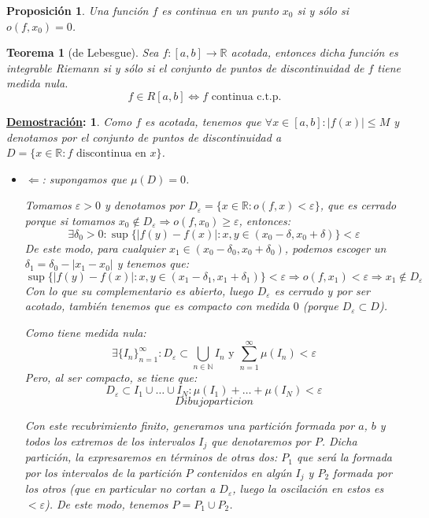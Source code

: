 \documentclass[10pt,a4paper,openright]{book}
\theoremstyle{break}
\newtheorem*{theo}{Teorema}
\newtheorem*{prop}{Proposición}
\newtheorem*{demo}{\underline{Demostración}:}
\begin{document}
\begin{prop}
Una función $f$ es continua en un punto $x_0$ si y sólo si $o\left(f, x_0\right) = 0$.
\end{prop}

\begin{theo}[de Lebesgue]
Sea $f: \left[a, b\right] \rightarrow \mathbb{R}$ acotada, entonces dicha función es integrable Riemann si y sólo si el conjunto de puntos de discontinuidad de $f$ tiene medida nula.
$$f\in R[a,b]\Leftrightarrow f \mbox{ continua c.t.p.}$$
\end{theo}
\begin{demo}
Como $f$ es acotada, tenemos que $\forall x \in \left[a, b\right] : \vert f\left(x\right)\vert \le M$ y denotamos por el conjunto de puntos de discontinuidad a $D = \{x\in \mathbb{R} : f \text{ discontinua en } x\}$.
\begin{itemize}
\item $\Leftarrow$: supongamos que $\mu\left(D\right) = 0$.

Tomamos $\varepsilon > 0$ y denotamos por $D_{\varepsilon} = \{x\in \mathbb{R}: o\left(f, x\right) < \varepsilon\}$, que es cerrado porque si tomamos $x_0 \not\in D_{\varepsilon} \Rightarrow o\left(f, x_0\right) \ge \varepsilon$, entonces:
$$\exists \delta_0 > 0: \sup \{ \vert f\left(y\right) - f\left(x\right) \vert: x, y \in \left(x_0 - \delta, x_0 + \delta \right) \} < \varepsilon$$
De este modo, para cualquier $x_1 \in \left(x_0 - \delta_0, x_0 + \delta_0 \right)$, podemos escoger un $\delta_1 = \delta_0 - |x_1-x_0|$ y tenemos que:
$$\sup \{ \vert f\left(y\right) - f\left(x\right) \vert : x, y \in \left(x_1 - \delta_1, x_1 + \delta_1 \right) \} < \varepsilon \Rightarrow o\left(f, x_1\right) < \varepsilon \Rightarrow x_1 \not\in D_{\varepsilon}$$
Con lo que su complementario es abierto, luego $D_\varepsilon$ es cerrado y por ser acotado, también tenemos que es compacto con medida $0$ (porque $D_\varepsilon \subset D$).

Como tiene medida nula:
$$\exists \{I_n\}_{n=1}^{\infty}: D_{\varepsilon} \subset \bigcup_{n \in \mathbb{N}} I_n \mbox{ y } \sum_{n=1}^{\infty} \mu\left(I_n\right) < \varepsilon$$
Pero, al ser compacto, se tiene que:
$$D_{\varepsilon} \subset I_1 \cup \ldots \cup I_N :  \mu\left(I_1\right) + \ldots + \mu\left(I_N\right) < \varepsilon $$
$$Dibujo particion$$

Con este recubrimiento finito, generamos una partición formada por $a$, $b$ y todos los extremos de los intervalos $I_j$ que denotaremos por $P$. Dicha partición, la expresaremos en términos de otras dos: $P_1$ que será la formada por los intervalos de la partición $P$ contenidos en algún $I_j$ y $P_2$ formada por los otros (que en particular no cortan a $D_{\varepsilon}$, luego la oscilación en estos es $<\varepsilon$). De este modo, tenemos $P = P_1 \cup P_2$.


\end{itemize}
\end{demo}
\end{document}

